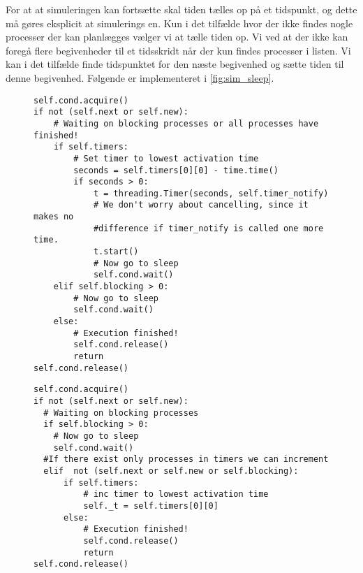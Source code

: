 For at at simuleringen kan fortsætte skal tiden tælles op på et tidspunkt, og dette må gøres eksplicit at simulerings \sched en.  Kun i det tilfælde hvor der ikke findes nogle processer der kan planlægges vælger vi at tælle tiden op. Vi ved at der ikke kan foregå flere begivenheder til et tidsskridt når der kun findes processer i  listen. Vi kan i det tilfælde finde tidspunktet for den næste begivenhed og sætte tiden til denne begivenhed. Følgende er implementeret i \cref{fig:sim_sleep}.
\begin{figure}[hbtp]
\begin{minipage}[c]{\linewidth}
\begin{lstlisting}[firstnumber=239, label=fig:blocking_sleep, caption=Uddrag af \sched en i \code{Scheduler}]
self.cond.acquire()
if not (self.next or self.new):
    # Waiting on blocking processes or all processes have finished!
    if self.timers:
        # Set timer to lowest activation time
        seconds = self.timers[0][0] - time.time()
        if seconds > 0:
            t = threading.Timer(seconds, self.timer_notify)
            # We don't worry about cancelling, since it makes no 
            #difference if timer_notify is called one more time.
            t.start()
            # Now go to sleep
            self.cond.wait()
    elif self.blocking > 0:
        # Now go to sleep
        self.cond.wait()
    else:
        # Execution finished!
        self.cond.release()
        return
self.cond.release()
\end{lstlisting}
\end{minipage}
\begin{minipage}[c]{\linewidth}
\begin{lstlisting}[firstnumber=158, label=fig:sim_sleep, caption= uddrag af \sched en i \code{Simulation}]
self.cond.acquire()
if not (self.next or self.new):
  # Waiting on blocking processes
  if self.blocking > 0:
    # Now go to sleep
    self.cond.wait()
  #If there exist only processes in timers we can increment
  elif  not (self.next or self.new or self.blocking): 
      if self.timers:
          # inc timer to lowest activation time
          self._t = self.timers[0][0]
      else:
          # Execution finished!
          self.cond.release()
          return
self.cond.release()  
\end{lstlisting}
\end{minipage}
\end{figure}

